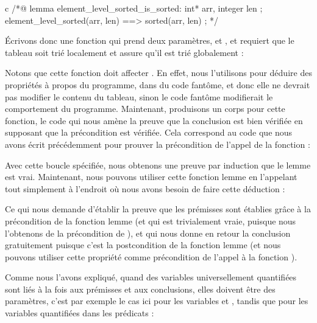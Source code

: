 \begin{CodeBlock}{c}
/*@
  lemma element_level_sorted_is_sorted:
    \forall int* arr, integer len ;
       element_level_sorted(arr, len) ==> sorted(arr, len) ;
*/
\end{CodeBlock}


Écrivons donc une fonction qui prend deux paramètres,  et
, et requiert que le tableau soit trié localement et assure
qu'il est trié globalement :




Notons que cette fonction doit affecter .
En effet, nous l'utilisons pour déduire des propriétés à propos du programme, dans
du code fantôme, et donc elle ne devrait pas modifier le contenu du tableau, sinon
le code fantôme modifierait le comportement du programme. Maintenant, produisons un
corps pour cette fonction, le code qui nous amène la preuve que la conclusion est
bien vérifiée en supposant que la précondition est vérifiée. Cela correspond au
code que nous avons écrit précédemment pour prouver la précondition de l'appel de
la fonction  :





Avec cette boucle spécifiée, nous obtenons une preuve par induction que le lemme
est vrai. Maintenant, nous pouvons utiliser cette fonction lemme en
l'appelant tout simplement à l'endroit où nous avons besoin de faire cette
déduction :




Ce qui nous demande d'établir la preuve que les prémisses sont établies grâce
à la précondition de la fonction lemme (et qui est trivialement vraie,
puisque nous l'obtenons de la précondition de ), et
qui nous donne en retour la conclusion gratuitement puisque c'est la postcondition
de la fonction lemme (et nous pouvons utiliser cette propriété comme
précondition de l'appel à la fonction ).


Comme nous l'avons expliqué, quand des variables universellement quantifiées
sont liés à la fois aux prémisses et aux conclusions, elles doivent être des
paramètres, c'est par exemple le cas ici pour les variables 
et , tandis que pour les variables quantifiées dans les
prédicats :



